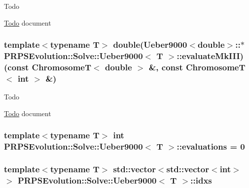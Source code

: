 \begin{DoxyRefDesc}{\-Todo}
\item[\hyperlink{todo__todo000009}{\-Todo}]document \end{DoxyRefDesc}
\hypertarget{struct_p_r_p_s_evolution_1_1_solve_1_1_ueber9000_af6f8d388aab7bab1737d2fa8eb479e14}{
\subsubsection[{evaluate\-Mk\-I\-I\-I}]{\setlength{\rightskip}{0pt plus 5cm}template$<$typename \-T$>$ double({\bf \-Ueber9000}$<$double$>$\-::$\ast$ {\bf \-P\-R\-P\-S\-Evolution\-::\-Solve\-::\-Ueber9000}$<$ \-T $>$\-::{\bf evaluate\-Mk\-I\-I\-I})(const \-Chromosome\-T$<$ double $>$ \&, const \-Chromosome\-T$<$ int $>$ \&)}}\label{struct_p_r_p_s_evolution_1_1_solve_1_1_ueber9000_af6f8d388aab7bab1737d2fa8eb479e14}
\begin{DoxyRefDesc}{\-Todo}
\item[\hyperlink{todo__todo000010}{\-Todo}]document \end{DoxyRefDesc}
\hypertarget{struct_p_r_p_s_evolution_1_1_solve_1_1_ueber9000_a4fbe24b7462ad9fd46e6a97416b8d788}{
\subsubsection[{evaluations}]{\setlength{\rightskip}{0pt plus 5cm}template$<$typename \-T$>$ int {\bf \-P\-R\-P\-S\-Evolution\-::\-Solve\-::\-Ueber9000}$<$ \-T $>$\-::{\bf evaluations} = 0}}\label{struct_p_r_p_s_evolution_1_1_solve_1_1_ueber9000_a4fbe24b7462ad9fd46e6a97416b8d788}
\hypertarget{struct_p_r_p_s_evolution_1_1_solve_1_1_ueber9000_a0742f16c54a3f01e756a84e2b714d571}{
\subsubsection[{idxs}]{\setlength{\rightskip}{0pt plus 5cm}template$<$typename \-T$>$ std\-::vector$<$std\-::vector$<$int$>$ $>$ {\bf \-P\-R\-P\-S\-Evolution\-::\-Solve\-::\-Ueber9000}$<$ \-T $>$\-::{\bf idxs}}}\label{struct_p_r_p_s_evolution_1_1_solve_1_1_ueber9000_a0742f16c54a3f01e756a84e2b714d571}
